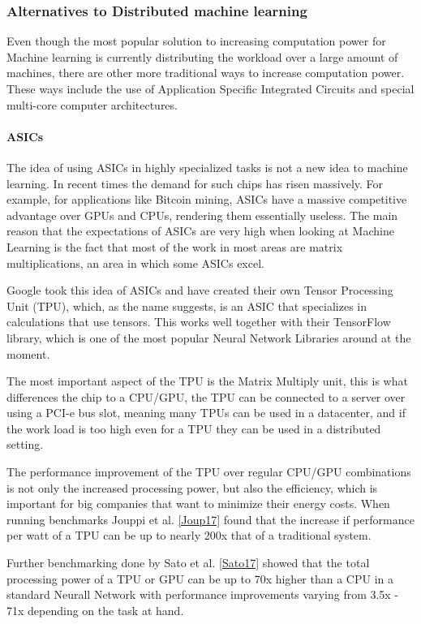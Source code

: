 
\subsubsection{Alternatives to Distributed machine learning}
Even though the most popular solution to increasing computation power for Machine
learning is currently distributing the workload over a large amount of machines,
there are other more traditional ways to increase computation power. These ways
include the use of Application Specific Integrated Circuits and special multi-core
computer architectures.

\paragraph{ASICs}
The idea of using ASICs in highly specialized tasks is not a new idea
to machine learning. In recent times the demand for such chips has risen massively\cite{Metz18}.
For example, for applications like Bitcoin mining, ASICs have a massive competitive
advantage over GPUs and CPUs, rendering them essentially useless. The main reason
that the expectations of ASICs are very high when looking at Machine
Learning is the fact that most of the work in most areas are matrix multiplications,
an area in which some ASICs excel.

Google took this idea of ASICs and have created their own Tensor Processing Unit (TPU)\cite{Sato17},
which, as the name suggests, is an ASIC that specializes in calculations that
use tensors. This works well together with their TensorFlow library, which is one
of the most popular Neural Network Libraries around at the moment.


The most important aspect of the TPU is the Matrix Multiply unit, this is what differences the chip to a CPU/GPU, the TPU can be connected to a server over using a PCI-e bus slot, meaning many TPUs can be used in a datacenter, and if the work load is too high even for a TPU they can be used in a distributed setting.

The performance improvement of the TPU over regular CPU/GPU combinations is not only the increased processing power, but also the efficiency, which is important
for big companies that want to minimize their energy costs. When running benchmarks Jouppi et al. \ref{Joup17} found that the increase if performance per watt of a TPU can be up to nearly 200x that of a traditional system.

Further benchmarking done by Sato et al. \ref{Sato17} showed that the total processing power of a TPU or GPU can be up to 70x higher than a CPU in a standard Neurall Network with performance improvements varying from 3.5x - 71x depending on the task at hand.


